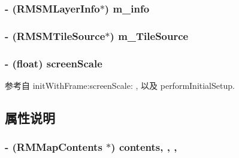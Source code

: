 \hypertarget{interface_r_m_map_view_aca406dc0027962e811a73ee69ce5db68}{
\subsubsection[{m\-\_\-info}]{\setlength{\rightskip}{0pt plus 5cm}-\/ ({\bf R\-M\-S\-M\-Layer\-Info}$\ast$) m\-\_\-info\hspace{0.3cm}{\ttfamily [protected]}}}\label{interface_r_m_map_view_aca406dc0027962e811a73ee69ce5db68}
\hypertarget{interface_r_m_map_view_af89039ac8817690a1dceadd43b44ab8f}{
\subsubsection[{m\-\_\-\-Tile\-Source}]{\setlength{\rightskip}{0pt plus 5cm}-\/ ({\bf R\-M\-S\-M\-Tile\-Source}$\ast$) m\-\_\-\-Tile\-Source\hspace{0.3cm}{\ttfamily [protected]}}}\label{interface_r_m_map_view_af89039ac8817690a1dceadd43b44ab8f}
\hypertarget{interface_r_m_map_view_a51d17c6a26beb3cbd1bf51de4aa1f774}{
\subsubsection[{screen\-Scale}]{\setlength{\rightskip}{0pt plus 5cm}-\/ (float) screen\-Scale\hspace{0.3cm}{\ttfamily [protected]}}}\label{interface_r_m_map_view_a51d17c6a26beb3cbd1bf51de4aa1f774}


参考自 init\-With\-Frame\-:screen\-Scale\-: , 以及 perform\-Initial\-Setup.



\subsection{属性说明}
\hypertarget{interface_r_m_map_view_a87dc341bead16abfa5b0f23260ac6ed9}{
\subsubsection[{contents}]{\setlength{\rightskip}{0pt plus 5cm}-\/ ({\bf R\-M\-Map\-Contents} $\ast$) contents\hspace{0.3cm}{\ttfamily [read]}, {\ttfamily [write]}, {\ttfamily [nonatomic]}, {\ttfamily [retain]}}}\label{interface_r_m_map_view_a87dc341bead16abfa5b0f23260ac6ed9}


